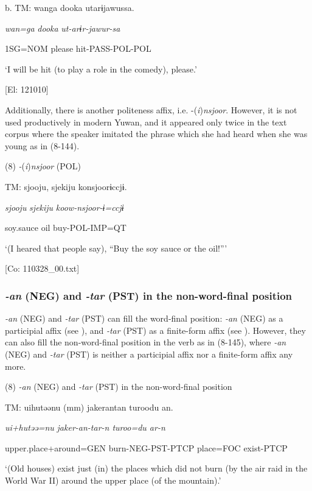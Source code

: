   b.  TM:  wanga  dooka  utarɨjawussa.

      \textit{wan=ga}  \textit{dooka}  \textit{ut-arɨr-jawur{}-sa}

      1SG=NOM  please  hit-PASS-POL-POL

      ‘I will be hit (to play a role in the comedy), please.’

      [El: 121010]

  Additionally, there is another politeness affix, i.e. -(\textit{i})\textit{nsjoor}. However, it is not used productively in modern Yuwan, and it appeared only twice in the text corpus where the speaker imitated the phrase which she had heard when she was young as in (8-144).

(8)  \textit{{}-}(\textit{i})\textit{nsjoor} (POL)

  TM:  {\textbar}sjooju,  sjekiju{\textbar}  konsjoorɨccjɨ.

    \textit{sjooju}  \textit{sjekiju}  \textit{koow-nsjoor{}-ɨ=ccjɨ}

    soy.sauce  oil  buy-POL-IMP=QT

    ‘(I heared that people say), “Buy the soy sauce or the oil!”’

    [Co: 110328\_00.txt]

\subsubsection{\textit{{}-an} (NEG) and \textit{{}-tar} (PST) in the non-word-final position}

\textit{{}-an} (NEG) and \textit{{}-tar} (PST) can fill the word-final position: \textit{{}-an} (NEG) as a participial affix (see ), and \textit{{}-tar} (PST) as a finite-form affix (see ). However, they can also fill the non-word-final position in the verb as in (8-145), where \textit{{}-an} (NEG) and \textit{{}-tar} (PST) is neither a participial affix nor a finite-form affix any more.

(8)  \textit{{}-an} (NEG) and \textit{-tar} (PST) in the non-word-final position

  TM:  uihutəənu  (mm)  {\textbar}jaker{\textbar}antan  turoodu  an.

    \textit{ui+hutəə=nu}    \textit{jaker-an-tar{}-n  turoo=du  ar-n}

    upper.place+around=GEN    burn-NEG-PST-PTCP  place=FOC  exist-PTCP

    ‘(Old houses) exist just (in) the places which did not burn (by the air raid in the World War II) around the upper place (of the mountain).’

